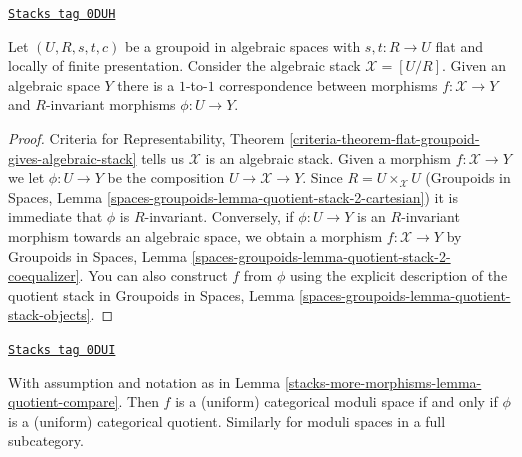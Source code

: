 \begin{lemma}
\label{stacks-more-morphisms-lemma-quotient-compare}
\href{https://stacks.math.columbia.edu/tag/0DUH}{\texttt{Stacks tag 0DUH}}

Let $(U, R, s, t, c)$ be a groupoid in algebraic spaces with
$s, t : R \to U$ flat and locally of finite presentation.
Consider the algebraic stack $\mathcal{X} = [U/R]$.
Given an algebraic space $Y$ there is a $1$-to-$1$ correspondence between
morphisms $f : \mathcal{X} \to Y$ and $R$-invariant morphisms
$\phi : U \to Y$.
\end{lemma}

\begin{proof}
Criteria for Representability, Theorem
\ref{criteria-theorem-flat-groupoid-gives-algebraic-stack}
tells us $\mathcal{X}$ is an algebraic stack.
Given a morphism $f : \mathcal{X} \to Y$ we let $\phi : U \to Y$ be
the composition $U \to \mathcal{X} \to Y$. Since $R = U \times_\mathcal{X} U$
(Groupoids in Spaces, Lemma
\ref{spaces-groupoids-lemma-quotient-stack-2-cartesian})
it is immediate that $\phi$ is $R$-invariant.
Conversely, if $\phi : U \to Y$ is an $R$-invariant morphism towards
an algebraic space, we obtain a morphism
$f : \mathcal{X} \to Y$ by
Groupoids in Spaces, Lemma
\ref{spaces-groupoids-lemma-quotient-stack-2-coequalizer}.
You can also construct $f$ from $\phi$ using the explicit description of
the quotient stack in
Groupoids in Spaces, Lemma
\ref{spaces-groupoids-lemma-quotient-stack-objects}.
\end{proof}

\begin{lemma}
\label{stacks-more-morphisms-lemma-categorical-quotient-compare}
\href{https://stacks.math.columbia.edu/tag/0DUI}{\texttt{Stacks tag 0DUI}}

With assumption and notation as in Lemma \ref{stacks-more-morphisms-lemma-quotient-compare}.
Then $f$ is a (uniform) categorical moduli space
if and only if $\phi$ is a (uniform) categorical quotient.
Similarly for moduli spaces in a full subcategory.
\end{lemma}

